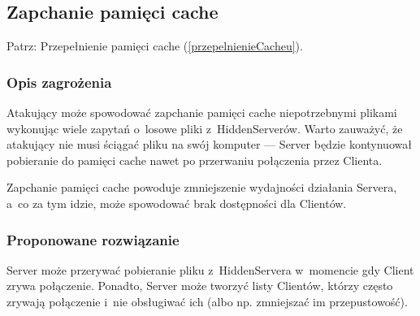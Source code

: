 \documentclass[a4paper,notitlepage]{article}
\begin{document}
\subsection{Zapchanie pamięci cache}
Patrz: Przepełnienie pamięci cache (\ref{przepelnienieCacheu}). 
\subsubsection*{Opis zagrożenia}
Atakujący może spowodować zapchanie pamięci cache niepotrzebnymi plikami
wykonując wiele zapytań o~losowe pliki z~HiddenServerów. Warto zauważyć,
że atakujący nie musi ściągać pliku na swój komputer --- Server będzie
kontynuował pobieranie do pamięci cache nawet po przerwaniu połączenia
przez Clienta.

Zapchanie pamięci cache powoduje zmniejszenie wydajności działania Servera,
a~co za tym idzie, może spowodować brak dostępności dla Clientów.

\subsubsection*{Proponowane rozwiązanie}
Server może przerywać pobieranie pliku z~HiddenServera w~momencie gdy
Client zrywa połączenie. Ponadto, Server może tworzyć listy Clientów,
którzy często zrywają połączenie i~nie obsługiwać ich (albo np. zmniejszać
im przepustowość).
\end{document}
